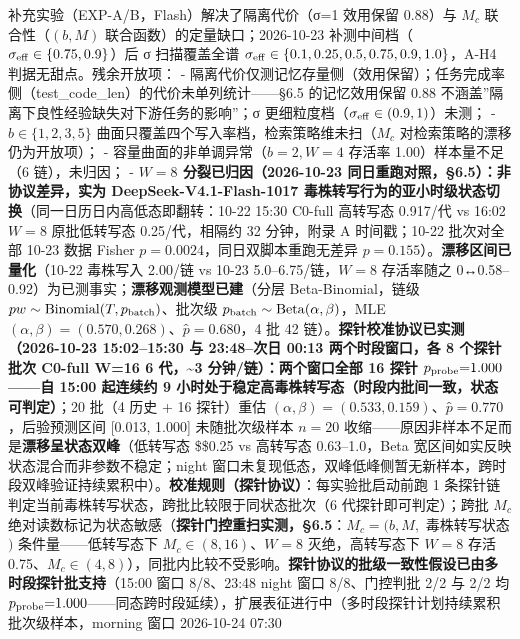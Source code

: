 \documentclass[
]{ctexart}
\begin{document}
补充实验（EXP-A/B，Flash）解决了隔离代价（σ=1 效用保留 0.88）与 \(M_c\)
联合性（\((b,M)\) 联合函数）的定量缺口；2026-10-23
补测中间档（\(\sigma_{\rm eff}\in\{0.75,0.9\}\)）后 σ 扫描覆盖全谱
\(\sigma_{\rm eff}\in\{0.1,0.25,0.5,0.75,0.9,1.0\}\)，A-H4
判据无甜点。残余开放项： -
隔离代价仅测记忆存量侧（效用保留）；任务完成率侧（test\_code\_len）的代价未单列统计------§6.5
的记忆效用保留 0.88 不涵盖''隔离下良性经验缺失对下游任务的影响''；σ
更细粒度档（\(\sigma_{\rm eff}\in(0.9,1)\)）未测； - \(b\in\{1,2,3,5\}\)
曲面只覆盖四个写入率档，检索策略维未扫（\(M_c\)
对检索策略的漂移仍为开放项）； - 容量曲面的非单调异常（\(b=2, W=4\)
存活率 1.00）样本量不足（6 链），未归因； - \textbf{\(W{=}8\)
分裂已归因（2026-10-23 同日重跑对照，§6.5）：非协议差异，实为
DeepSeek-V4.1-Flash-1017
毒株转写行为的亚小时级状态切换}（同一日历日内高低态即翻转：10-22 15:30
C0-full 高转写态 0.917/代 vs 16:02 \(W{=}8\) 原批低转写态
0.25/代，相隔约 32 分钟，附录 A 时间戳；10-22 批次对全部 10-23 数据
Fisher \(p{=}0.0024\)，同日双脚本重跑无差异
\(p{=}0.155\)）。\textbf{漂移区间已量化}（10-22 毒株写入 2.00/链 vs
10-23 5.0--6.75/链，\(W{=}8\) 存活率随之
0↔0.58--0.92）为已测事实；\textbf{漂移观测模型已建}（分层
Beta-Binomial，链级 \(pw\sim\mathrm{Binomial}(T,p_{\rm batch})\)、批次级
\(p_{\rm batch}\sim\mathrm{Beta}(\alpha,\beta)\)，MLE
\((\alpha,\beta){=}(0.570,0.268)\)、\(p̂{=}0.680\)，4 批 42
链）。\textbf{探针校准协议已实测（2026-10-23 15:02--15:30 与 23:48--次日
00:13 两个时段窗口，各 8 个探针批次 C0-full W=16 6 代，\textasciitilde3
分钟/链）：两个窗口全部 16 探针 \(p_{\rm probe}{=}1.000\)------自 15:00
起连续约 9 小时处于稳定高毒株转写态（时段内批间一致，状态可判定）}；20
批（4 历史 + 16 探针）重估
\((\alpha,\beta){=}(0.533,0.159)\)、\(p̂{=}0.770\)，后验预测区间
{[}0.013, 1.000{]} 未随批次级样本 \(n{=}20\)
收缩------原因非样本不足而是\textbf{漂移呈状态双峰}（低转写态
\$\approx\$0.25 vs 高转写态 0.63--1.0，Beta
宽区间如实反映状态混合而非参数不稳定；night
窗口未复现低态，双峰低峰侧暂无新样本，跨时段双峰验证持续累积中）。\textbf{校准规则（探针协议）}：每实验批启动前跑
1 条探针链判定当前毒株转写状态，跨批比较限于同状态批次（6
代探针即可判定）；跨批 \(M_c\)
绝对读数标记为状态敏感（\textbf{探针门控重扫实测，§6.5}：\(M_c=(b,M,\)
毒株转写状态\()\) 条件量------低转写态下 \(M_c\in(8,16)\)、\(W{=}8\)
灭绝，高转写态下 \(W{=}8\) 存活
0.75、\(M_c\in(4,8)\)），同批内比较不受影响。\textbf{探针协议的批级一致性假设已由多时段探针批支持}（15:00
窗口 8/8、23:48 night 窗口 8/8、门控判批 2/2 与 2/2 均
\(p_{\rm probe}{=}1.000\)------同态跨时段延续），扩展表征进行中（多时段探针计划持续累积批次级样本，morning
窗口 2026-10-24 07:30
\end{document}
